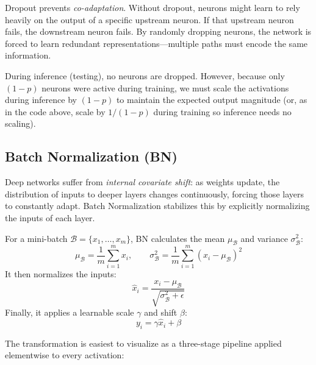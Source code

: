\documentclass{tufte-handout}
\begin{document}
Dropout prevents \textit{co-adaptation}. Without dropout, neurons might learn to rely heavily on the output of a specific upstream neuron. If that upstream neuron fails, the downstream neuron fails. By randomly dropping neurons, the network is forced to learn redundant representations—multiple paths must encode the same information.

During inference (testing), no neurons are dropped. However, because only $(1-p)$ neurons were active during training, we must scale the activations during inference by $(1-p)$ to maintain the expected output magnitude (or, as in the code above, scale by $1/(1-p)$ during training so inference needs no scaling).

\subsection{Batch Normalization (BN)}

Deep networks suffer from \textit{internal covariate shift}: as weights update, the distribution of inputs to deeper layers changes continuously, forcing those layers to constantly adapt. Batch Normalization stabilizes this by explicitly normalizing the inputs of each layer.

For a mini-batch $\mathcal{B} = \{x_1, \dots, x_m\}$, BN calculates the mean $\mu_{\mathcal{B}}$ and variance $\sigma_{\mathcal{B}}^2$:
\[
\mu_{\mathcal{B}} = \frac{1}{m}\sum_{i=1}^m x_i, \qquad \sigma_{\mathcal{B}}^2 = \frac{1}{m}\sum_{i=1}^m (x_i - \mu_{\mathcal{B}})^2
\]
It then normalizes the inputs:
\[
\hat{x}_i = \frac{x_i - \mu_{\mathcal{B}}}{\sqrt{\sigma_{\mathcal{B}}^2 + \epsilon}}
\]
Finally, it applies a learnable scale $\gamma$ and shift $\beta$:
\[
y_i = \gamma \hat{x}_i + \beta
\]

The transformation is easiest to visualize as a three-stage pipeline applied elementwise to every activation:
\end{document}
